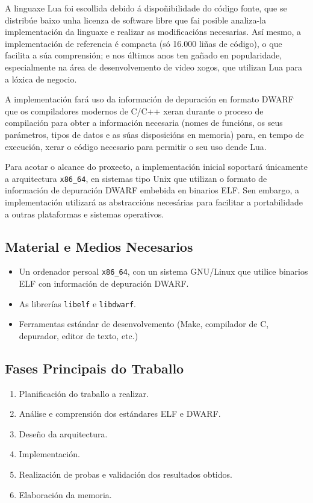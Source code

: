 A linguaxe Lua foi escollida debido á dispoñibilidade do código fonte, que se
distribúe baixo unha licenza de software libre que fai posible analiza-la
implementación da linguaxe e realizar as modificacións necesarias. Así
mesmo, a implementación de referencia é compacta (só 16.000 liñas de código),
o que facilita a súa comprensión; e nos últimos anos ten gañado en
popularidade, especialmente na área de desenvolvemento de video xogos,
que utilizan Lua para a lóxica de negocio.

A implementación fará uso da información de depuración en formato DWARF
que os compiladores modernos de C/C++ xeran durante o proceso de compilación
para obter a información necesaria (nomes de funcións, os seus parámetros,
tipos de datos e as súas disposicións en memoria) para, en tempo de execución,
xerar o código necesario para permitir o seu uso dende Lua.

Para acotar o alcance do proxecto, a implementación inicial soportará
únicamente a arquitectura \texttt{x86\_64}, en sistemas tipo Unix que
utilizan o formato de información de depuración DWARF embebida en
binarios ELF. Sen embargo, a implementación utilizará as abstraccións
necesárias para facilitar a portabilidade a outras plataformas e
sistemas operativos.

\subsection*{Material e Medios Necesarios}

\begin{itemize}
	\item Un ordenador persoal \texttt{x86\_64}, con un sistema GNU/Linux
		que utilice binarios ELF con información de depuración DWARF.
	\item As librerías \texttt{libelf} e \texttt{libdwarf}.
	\item Ferramentas estándar de desenvolvemento (Make, compilador de C,
		depurador, editor de texto, etc.)
\end{itemize}


\subsection*{Fases Principais do Traballo}

\begin{enumerate}
\item Planificación do traballo a realizar.
\item Análise e comprensión dos estándares ELF e DWARF.
\item Deseño da arquitectura.
\item Implementación.
\item Realización de probas e validación dos resultados obtidos.
\item Elaboración da memoria.
\end{enumerate}

